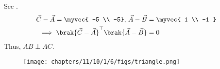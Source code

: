		See .
\begin{align}
	\vec{C}-\vec{A}=\myvec{
-5 \\
	-5},\,
	\vec{A}-\vec{B}&=\myvec{
1 \\
-1 
}
\\
	\implies \brak{\vec{C}-\vec{A}}^{\top}
	\brak{\vec{A}-\vec{B}}&=0
\end{align}
Thus, $AB \perp AC$.
	\begin{figure}[H]
		\centering
 \texttt{[image: chapters/11/10/1/6/figs/triangle.png]}
		\caption{}
		\label{fig:11/10/1/6}
  	\end{figure}
